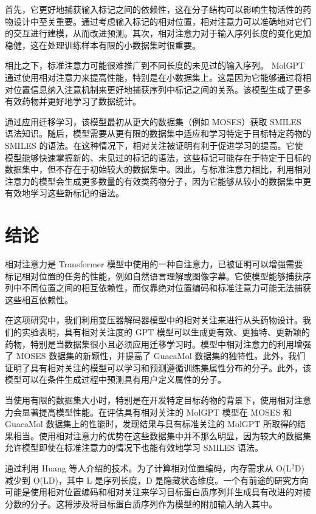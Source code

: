 \begin{translation}
首先，它更好地捕获输入标记之间的依赖性，这在分子结构可以影响生物活性的药物设计中至关重要。通过考虑输入标记的相对位置，相对注意力可以准确地对它们的交互进行建模，从而改进预测。其次，相对注意力对于输入序列长度的变化更加稳健，这在处理训练样本有限的小数据集时很重要。

相比之下，标准注意力可能很难推广到不同长度的未见过的输入序列。 MolGPT 通过使用相对注意力来提高性能，特别是在小数据集上。这是因为它能够通过将相对位置信息纳入注意机制来更好地捕获序列中标记之间的关系。该模型生成了更多有效药物并更好地学习了数据统计。

通过应用迁移学习，该模型最初从更大的数据集（例如 MOSES）获取 SMILES 语法知识。随后，模型需要从更有限的数据集中适应和学习特定于目标特定药物的 SMILES 的语法。在这种情况下，相对关注被证明有利于促进学习的提高。它使模型能够快速掌握新的、未见过的标记的语法，这些标记可能存在于特定于目标的数据集中，但不存在于初始较大的数据集中。因此，与标准注意力相比，利用相对注意力的模型会生成更多数量的有效类药物分子，因为它能够从较小的数据集中更有效地学习这些新标记的语法。

\section{结论}

相对注意力是 Transformer 模型中使用的一种自注意力，已被证明可以增强需要标记相对位置的任务的性能，例如自然语言理解或图像字幕。它使模型能够捕获序列中不同位置之间的相互依赖性，而仅靠绝对位置编码和标准注意力可能无法捕获这些相互依赖性。

在这项研究中，我们利用变压器解码器模型中的相对关注来进行从头药物设计。我们的实验表明，具有相对关注度的 GPT 模型可以生成更有效、更独特、更新颖的药物，特别是当数据集很小且必须应用迁移学习时。模型中相对注意力的利用增强了 MOSES 数据集的新颖性，并提高了 GuacaMol 数据集的独特性。此外，我们证明了具有相对关注的模型可以学习和预测遵循训练集属性分布的分子。此外，该模型可以在条件生成过程中预测具有用户定义属性的分子。

当使用有限的数据集大小时，特别是在开发特定目标药物的背景下，使用相对注意力会显著提高模型性能。在评估具有相对关注的 MolGPT 模型在 MOSES 和 GuacaMol 数据集上的性能时，发现结果与具有标准关注的 MolGPT 所取得的结果相当。使用相对注意力的优势在这些数据集中并不那么明显，因为较大的数据集允许模型即使在标准注意力的情况下也能有效地学习 SMILES 语法。

通过利用 Huang 等人介绍的技术。为了计算相对位置编码，内存需求从 O(L$^2$D) 减少到 O(LD)，其中 L 是序列长度，D 是隐藏状态维度。一个有前途的研究方向可能是使用相对位置编码和相对关注来学习目标蛋白质序列并生成具有改进的对接分数的分子。这将涉及将目标蛋白质序列作为模型的附加输入纳入其中。


\end{translation}
